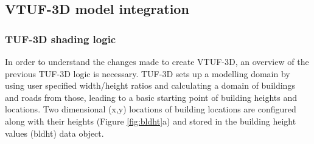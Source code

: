 \documentclass[preprint,12pt,authoryear]{elsarticle}
\begin{document}
\subsection{VTUF-3D model integration}\label{sec:integration}
\subsubsection{TUF-3D shading logic}\label{sec:existingshading}
In order to understand the changes made to create VTUF-3D, an overview of the previous TUF-3D logic is necessary. TUF-3D sets up a modelling domain by using user specified width/height ratios and calculating a domain of buildings and roads from those, leading to a basic starting point of building heights and locations. Two dimensional (x,y) locations of building locations are configured along with their heights (Figure \ref{fig:bldht}a) and stored in the building height values (bldht) data object.
\end{document}
